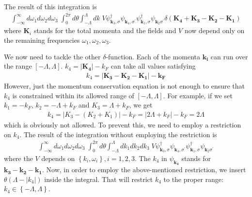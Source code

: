 \documentclass[14pt]{extarticle}
\begin{document}
The result of this integration is
\begin{equation}\begin{aligned}
\int_{-\infty}^\infty d\omega_1 d\omega_2 d\omega_3\;\int_0^{2\pi} d\theta \int_{-\Lambda}^{\Lambda}dk \;V\psi_{\mathbf k_3,\sigma}^\dagger\psi_{\mathbf k_4,\sigma^\prime}\psi_{\mathbf k_1,\sigma}^\dagger\psi_{\mathbf k_2\sigma^\prime} \delta(\mathbf{K_4}+\mathbf{K_3} - \mathbf{K_2} - \mathbf{K_1})
\end{aligned}\end{equation}
where \(\mathbf K_i\) stands for the total momenta and the fields and \(V\) now depend only on the remaining frequencies \(\omega_1,\omega_2,\omega_3\).
 
We now need to tackle the other \(\delta\)-function. Each of the momenta \(\mathbf{k_i}\) can run over the range \([-\Lambda,\Lambda]\). \(k_4 = |\mathbf{K_4}| - k_F\) can take all values satisfying
\begin{equation}\begin{aligned}
k_4 = |\mathbf{K_3} -\mathbf{K_2} - \mathbf{K_1}| - \mathbf{k_F}
\end{aligned}\end{equation}
However, just the momentum conservation equation is not enough to ensure that \(k_4\) is constrained within its allowed range of \(\left[-\Lambda, \Lambda\right]\). For example, if we set \(k_1=-k_F\), \(k_2  = -\Lambda + k_F\) and \(K_3 = \Lambda + k_F\), we get
\begin{equation}\begin{aligned}
k_4 = |K_3 - (K_2 + K_1)| - k_F = |2\Lambda + k_F| - k_F = 2\Lambda
\end{aligned}\end{equation}
which is obviously not allowed. To prevent this, we need to employ a restriction on \(k_4\). The result of the integration without employing the restriction is
\begin{equation}\begin{aligned}
\int_{-\infty}^\infty d\omega_1 d\omega_2 d\omega_3\;\int_0^{2\pi} d\theta \int_{-\Lambda}^{\Lambda}dk_1 dk_2 dk_3 \;V\psi_{\mathbf k_3,\sigma}^\dagger\psi_{\mathbf k_4,\sigma^\prime}\psi_{\mathbf k_1,\sigma}^\dagger\psi_{\mathbf k_2\sigma^\prime}
\end{aligned}\end{equation}
where the \(V\) depends on \(\left\{k_i,\omega_i\right\}, i=1,2,3\). The \(k_4\) in \(\psi_{\mathbf{k_4}}\) stands for \(\mathbf{k_3} -\mathbf{k_2} - \mathbf{k_1}\). Now, in order to employ the above-mentioned restriction, we insert \(\theta(\Lambda - |k_4|)\) inside the integral. That will restrict \(k_4\) to the proper range: \(k_4 \in \left\{-\Lambda,\Lambda\right\}\).
\end{document}
